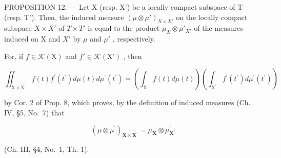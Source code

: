 PROPOSITION 12. --- Let X (resp. X') be a locally compact subspace of T (resp. T'). Then, the induced measure \((\mu \otimes \mu')_{X \times X'}\) on the locally compact subspace \(X \times X'\) of \(T \times T'\) is equal to the product \(\mu_{X} \otimes \mu'_{X'}\) of the measures induced on X and \(X'\) by \(\mu\) and \(\mu'\) , respectively.

For, if \(f \in \mathcal{K}(\mathrm{X})\) and \(f' \in \mathcal{K}(\mathrm{X}')\) , then

\[
\iint_ {\mathrm{X} \times \mathrm{X} ^ {\prime}} f (t) f ^ {\prime} (t ^ {\prime}) d \mu (t) d \mu^ {\prime} (t ^ {\prime}) = \left(\int_ {\mathrm{X}} f (t) d \mu (t)\right) \left(\int_ {\mathrm{X} ^ {\prime}} f ^ {\prime} (t ^ {\prime}) d \mu^ {\prime} (t ^ {\prime})\right)
\]

by Cor. 2 of Prop. 8, which proves, by the definition of induced measures (Ch. IV, §5, No.~7) that

\[
(\mu \otimes \mu^ {\prime}) _ {\mathbf {X} \times \mathbf {X} ^ {\prime}} = \mu_ {\mathbf {X}} \otimes \mu_ {\mathbf {X} ^ {\prime}} ^ {\prime}
\]

(Ch. III, §4, No.~1, Th. 1).

